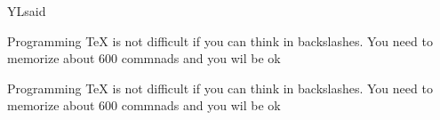 
\begin{quotationX}{YL}{said}
\item Programming TeX is not difficult if you can think in backslashes. 
You need to memorize about 600 commnads and you wil be ok
\item Programming TeX is not difficult if you can think in backslashes. 
You need to memorize about 600 commnads and you wil be ok
\end{quotationX}





